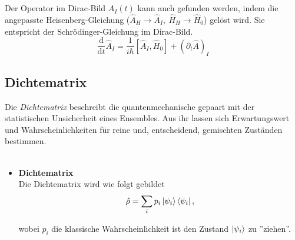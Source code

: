 \documentclass{article}
\newcommand{\diff}{\mathrm{d}}
\begin{document}
\begin{itemize}
\textcolor{gruen}{Der Operator im Dirac-Bild $\hat{A}_I(t)$ kann auch gefunden werden, indem die angepasste Heisenberg-Gleichung ($\hat{A}_H\to \hat{A}_I,\ \hat{H}_H\to \hat{H}_0$) gelöst wird. Sie entspricht der Schrödinger-Gleichung im Dirac-Bild.
		\begin{equation}
			\frac{\diff}{\diff t}\hat{A}_I = \frac{1}{i\hbar} [\hat{A}_I,\hat{H}_0] + (\partial_t \hat{A})_I
		\end{equation}
}

\end{itemize}


\newpage


\subsection{Dichtematrix}
Die \textit{Dichtematrix} beschreibt die quantenmechanische gepaart mit der statistischen Unsicherheit eines Ensembles. Aus ihr lassen sich Erwartungswert und Wahrscheinlichkeiten für reine und, entscheidend, gemischten Zuständen bestimmen.\\
\\
	\begin{itemize}
		\item \textbf{Dichtematrix}\\
		Die Dichtematrix wird wie folgt gebildet
			\begin{equation}
				\hat{\rho} = \sum_i p_i \ket{\psi_i} \bra{\psi_i},
			\end{equation}
		
		wobei $p_i$ die klassische Wahrscheinlichkeit ist den Zustand $\ket{\psi_i}$ zu ''ziehen''.
	\end{itemize}
\end{document}
